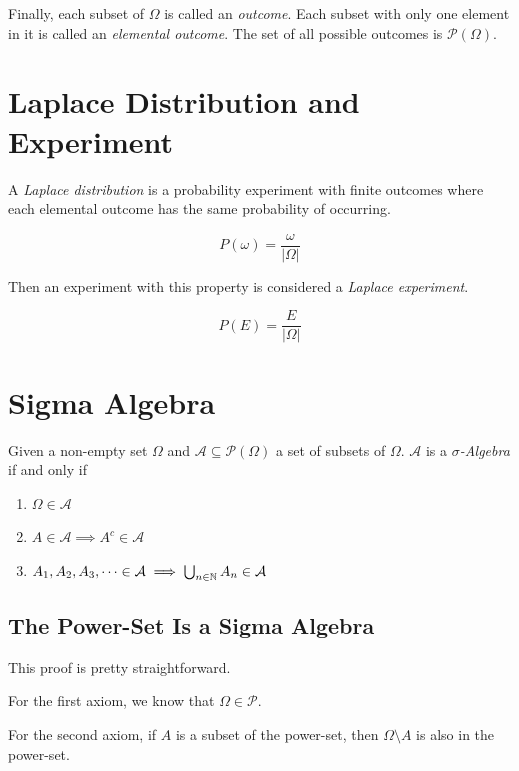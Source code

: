 Finally, each subset of \(\Omega\) is called an \emph{outcome}. Each subset with 
only one element in it is called an \emph{elemental outcome}. The set of all possible outcomes is 
\(\mathcal{P}(\Omega)\).

\section{Laplace Distribution and Experiment}

A \emph{Laplace distribution} is a probability experiment with finite outcomes where 
each elemental outcome has the same probability of occurring.

\[
    P(\omega) = \frac{\omega}{|\Omega|}
\]

Then an experiment with this property is considered a \emph{Laplace experiment}.

\[
    P(E) = \frac{E}{|\Omega|}
\]

\section{Sigma Algebra}

Given a non-empty set \(\Omega\) and \(\mathcal{A} \subseteq \mathcal{P}(\Omega)\) a set 
of subsets of \(\Omega\). \(\mathcal{A}\) is a \(\sigma\)\emph{-Algebra} if and only if 

\begin{enumerate}[label=\Roman*.]
    
    \item \(\Omega \in \mathcal{A} \) 

    \item \(A \in \mathcal{A} \implies A^c \in \mathcal{A} \)

    \item \(A_1, A_2, A_3, \dots \in \mathcal{A} \implies \bigcup_{n \in \mathbb{N}} A_n \in \mathcal{A} \)

\end{enumerate}

\subsection{The Power-Set Is a Sigma Algebra}

This proof is pretty straightforward. 

For the first axiom, we know that \(\Omega \in \mathcal{P}\). 

For the second axiom, if \(A\) is a subset of the power-set, then \(\Omega \setminus A\) is also 
in the power-set.

